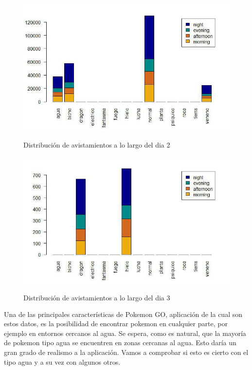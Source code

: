 \begin{figure}[H] %
\centering
\includegraphics[scale=0.8]{img/noche2.jpg}  %
\label{img/noche2.jpg}
\caption{Distribución de avistamientos a lo largo del dia 2}
\end{figure}

\begin{figure}[H] %
\centering
\includegraphics[scale=0.8]{img/noche3.jpg}  %
\label{img/noche3.jpg}
\caption{Distribución de avistamientos a lo largo del dia 3}
\end{figure}


Una de las principales características de Pokemon GO, aplicación de la cual son estos datos, es la posibilidad de encontrar pokemon en cualquier parte, por ejemplo en entornos cercanos al agua. Se espera, como es natural, que la mayoría de pokemon tipo agua se encuentren en zonas cercanas al agua. Esto daría un gran grado de realismo a la aplicación. Vamos a comprobar si esto es cierto con el tipo agua y a su vez con algunos otros. 


